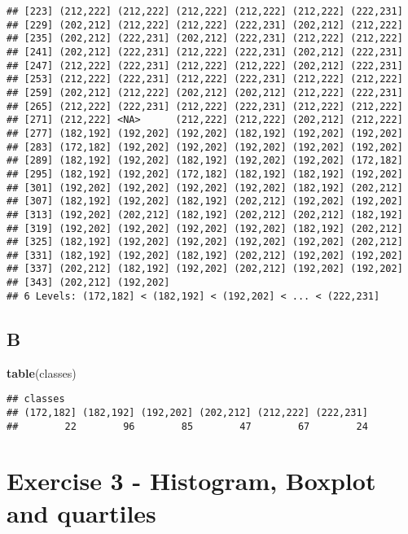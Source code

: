 \documentclass[
]{article}
\newenvironment{Shaded}{\begin{snugshade}}{\end{snugshade}}
\newcommand{\FunctionTok}[1]{\textcolor[rgb]{0.13,0.29,0.53}{\textbf{#1}}}
\newcommand{\NormalTok}[1]{#1}
\begin{document}
\begin{verbatim}
## [223] (212,222] (212,222] (212,222] (212,222] (212,222] (222,231]
## [229] (202,212] (212,222] (212,222] (222,231] (202,212] (212,222]
## [235] (202,212] (222,231] (202,212] (222,231] (212,222] (212,222]
## [241] (202,212] (222,231] (212,222] (222,231] (202,212] (222,231]
## [247] (212,222] (222,231] (212,222] (212,222] (202,212] (222,231]
## [253] (212,222] (222,231] (212,222] (222,231] (212,222] (212,222]
## [259] (202,212] (212,222] (202,212] (202,212] (212,222] (222,231]
## [265] (212,222] (222,231] (212,222] (222,231] (212,222] (212,222]
## [271] (212,222] <NA>      (212,222] (212,222] (202,212] (212,222]
## [277] (182,192] (192,202] (192,202] (182,192] (192,202] (192,202]
## [283] (172,182] (192,202] (192,202] (192,202] (192,202] (192,202]
## [289] (182,192] (192,202] (182,192] (192,202] (192,202] (172,182]
## [295] (182,192] (192,202] (172,182] (182,192] (182,192] (192,202]
## [301] (192,202] (192,202] (192,202] (192,202] (182,192] (202,212]
## [307] (182,192] (192,202] (182,192] (202,212] (192,202] (192,202]
## [313] (192,202] (202,212] (182,192] (202,212] (202,212] (182,192]
## [319] (192,202] (192,202] (192,202] (192,202] (182,192] (202,212]
## [325] (182,192] (192,202] (192,202] (192,202] (192,202] (202,212]
## [331] (182,192] (192,202] (182,192] (202,212] (192,202] (192,202]
## [337] (202,212] (182,192] (192,202] (202,212] (192,202] (192,202]
## [343] (202,212] (192,202]
## 6 Levels: (172,182] < (182,192] < (192,202] < ... < (222,231]
\end{verbatim}

\hypertarget{b-1}{%
\subsection{B}\label{b-1}}

\begin{Shaded}
\begin{Highlighting}[]
\FunctionTok{table}\NormalTok{(classes)}
\end{Highlighting}
\end{Shaded}

\begin{verbatim}
## classes
## (172,182] (182,192] (192,202] (202,212] (212,222] (222,231] 
##        22        96        85        47        67        24
\end{verbatim}

\hypertarget{exercise-3---histogram-boxplot-and-quartiles}{%
\section{Exercise 3 - Histogram, Boxplot and
quartiles}\label{exercise-3---histogram-boxplot-and-quartiles}}
\end{document}

